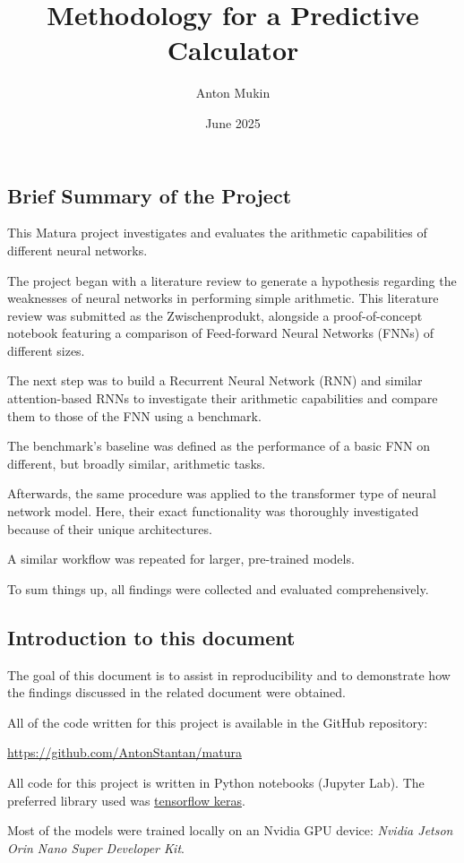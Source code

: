 \documentclass{article}
\title{Methodology for a Predictive Calculator}
\author{Anton Mukin}
\date{June 2025}
\begin{document}
\maketitle

\subsection{Brief Summary of the Project}
This Matura project investigates and evaluates the arithmetic capabilities of different neural networks.

The project began with a literature review to generate a hypothesis regarding the weaknesses of neural networks in performing simple arithmetic. This literature review was submitted as the Zwischenprodukt, alongside a proof-of-concept notebook featuring a comparison of Feed-forward Neural Networks (FNNs) of different sizes.

The next step was to build a Recurrent Neural Network (RNN) and similar attention-based RNNs to investigate their arithmetic capabilities and compare them to those of the FNN using a benchmark.

The benchmark's baseline was defined as the performance of a basic FNN on different, but broadly similar, arithmetic tasks.

Afterwards, the same procedure was applied to the transformer type of neural network model. Here, their exact functionality was thoroughly investigated because of their unique architectures.

A similar workflow was repeated for larger, pre-trained models.

To sum things up, all findings were collected and evaluated comprehensively.


\subsection{Introduction to this document}
The goal of this document is to assist in reproducibility and to demonstrate how the findings discussed in the related document were obtained.

All of the code written for this project is available in the GitHub repository:

\url{https://github.com/AntonStantan/matura}

All code for this project is written in Python notebooks (Jupyter Lab). The preferred library used was \href{https://www.tensorflow.org/guide/keras}{tensorflow keras}.

Most of the models were trained locally on an Nvidia GPU device: \textit{Nvidia Jetson Orin Nano Super Developer Kit}.
\end{document}

